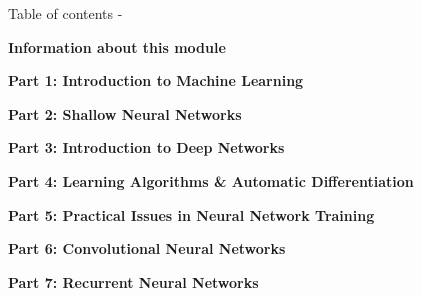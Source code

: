 %
%

\begin{frame}[allowframebreaks,t]{Table of contents -}

\setcounter{section}{-1}
\setcounter{tocdepth}{3}
\setcounter{secnumdepth}{2}

\linespread{1.1}

{\bf Information about this module}\\
\vspace{0.2cm}
\tableofcontents[part=0]

\vspace{0.2cm}

{\bf Part 1: Introduction to Machine Learning}\\
\vspace{0.2cm}
\tableofcontents[part=1]

\vspace{0.2cm}

{\bf Part 2: Shallow Neural Networks}\\
\vspace{0.2cm}
\tableofcontents[part=2]

\vspace{0.2cm}

{\bf Part 3: Introduction to Deep Networks}\\
\vspace{0.2cm}
\tableofcontents[part=3]

\vspace{0.2cm}

{\bf Part 4: Learning Algorithms \& Automatic Differentiation}\\
\vspace{0.2cm}
\tableofcontents[part=4]

\vspace{0.2cm}

{\bf Part 5: Practical Issues in Neural Network Training}\\
\vspace{0.2cm}
\tableofcontents[part=5]

\vspace{0.2cm}

{\bf Part 6: Convolutional Neural Networks}\\
\vspace{0.2cm}
\tableofcontents[part=6]

\vspace{0.2cm}

{\bf Part 7: Recurrent Neural Networks}\\
\vspace{0.2cm}
\tableofcontents[part=7]


\end{frame}
